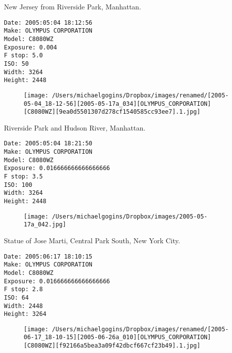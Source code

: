 \documentclass[11pt,letter,DIV=14,paper=landscape]{scrbook}
\begin{document}
\clearpage
\noindent New Jersey from Riverside Park, Manhattan.
\noindent
\begin{lstlisting}
Date: 2005:05:04 18:12:56
Make: OLYMPUS CORPORATION
Model: C8080WZ
Exposure: 0.004
F stop: 5.0
ISO: 50
Width: 3264
Height: 2448
\end{lstlisting}
\clearpage

\begin{figure}
\texttt{[image: /Users/michaelgogins/Dropbox/images/renamed/[2005-05-04\_18-12-56][2005-05-17a\_034][OLYMPUS\_CORPORATION][C8080WZ][9ea0d5501307d278cf1540585cc93ee7].1.jpg]}
\end{figure}
    
\clearpage
\noindent Riverside Park and Hudson River, Manhattan.
\noindent
\begin{lstlisting}
Date: 2005:05:04 18:21:50
Make: OLYMPUS CORPORATION
Model: C8080WZ
Exposure: 0.016666666666666666
F stop: 3.5
ISO: 100
Width: 3264
Height: 2448
\end{lstlisting}
\clearpage

\begin{figure}
\texttt{[image: /Users/michaelgogins/Dropbox/images/2005-05-17a\_042.jpg]}
\end{figure}
    
\clearpage
\noindent Statue of Jose Marti, Central Park South, New York City.
\noindent
\begin{lstlisting}
Date: 2005:06:17 18:10:15
Make: OLYMPUS CORPORATION
Model: C8080WZ
Exposure: 0.016666666666666666
F stop: 2.8
ISO: 64
Width: 2448
Height: 3264
\end{lstlisting}
\clearpage

\begin{figure}
\texttt{[image: /Users/michaelgogins/Dropbox/images/renamed/[2005-06-17\_18-10-15][2005-06-26a\_010][OLYMPUS\_CORPORATION][C8080WZ][f92166a5bea3a09f42dbcf667cf23b49].1.jpg]}
\end{figure}
    
\end{document}
